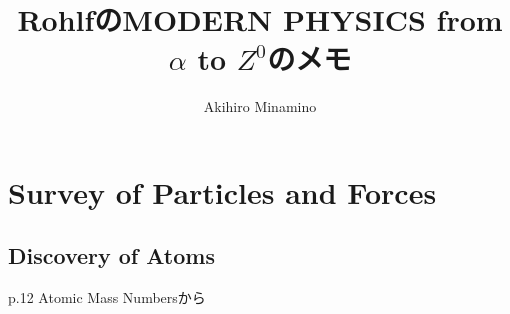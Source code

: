 \documentclass[11pt, oneside]{article}   	%
\title{RohlfのMODERN PHYSICS from $\alpha$ to $Z^{0}$のメモ}
\author{Akihiro Minamino}
\begin{document}
\maketitle
\section{Survey of Particles and Forces}
\subsection{Discovery of Atoms}

p.12 Atomic Mass Numbersから
\end{document}
